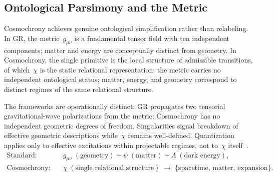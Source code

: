 \subsection{Ontological Parsimony and the Metric}
\label{subsec:ontological-parsimony-and-the-metric}

Cosmochrony achieves genuine ontological simplification rather than
relabeling.
In GR, the metric~$g_{\mu\nu}$ is a fundamental tensor field with ten
independent components; matter and energy are conceptually distinct from
geometry.
In Cosmochrony, the single primitive is the local structure of admissible
transitions, of which~$\chi$ is the static relational representation; the metric
carries no independent ontological status; matter, energy, and geometry correspond
to distinct regimes of the same relational structure.

The frameworks are operationally distinct: GR propagates two tensorial
gravitational-wave polarizations from the metric; Cosmochrony has no
independent geometric degrees of freedom.
Singularities signal breakdown of effective geometric descriptions
while~$\chi$ remains well-defined.
Quantization applies only to effective excitations within projectable
regimes, not to~$\chi$
itself~\cite{Rovelli1997}.
\begin{align}
  \text{Standard:} \quad
  & g_{\mu\nu}\;(\text{geometry})
    + \psi\;(\text{matter})
    + \Lambda\;(\text{dark energy}), \\
  \text{Cosmochrony:} \quad
  & \chi\;(\text{single relational structure})
    \;\longrightarrow\;
    \{\text{spacetime, matter, expansion}\}.
\end{align}
